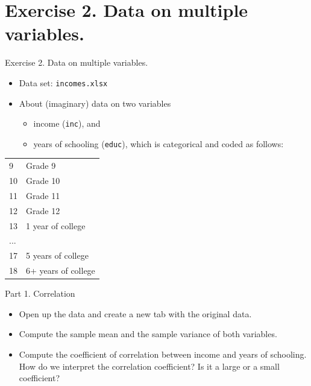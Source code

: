 \documentclass[
  10pt,
  ignorenonframetext,
]{beamer}
\providecommand{\tightlist}{%
  \setlength{\itemsep}{0pt}\setlength{\parskip}{0pt}}
\begin{document}
\hypertarget{exercise-2.-data-on-multiple-variables.}{%
\section{Exercise 2. Data on multiple
variables.}\label{exercise-2.-data-on-multiple-variables.}}

\begin{frame}[fragile]{Exercise 2. Data on multiple variables.}
\begin{itemize}
\tightlist
\item
  Data set: \texttt{incomes.xlsx}
\item
  About (imaginary) data on two variables

  \begin{itemize}
  \tightlist
  \item
    income (\texttt{inc}), and
  \item
    years of schooling (\texttt{educ}), which is categorical and coded
    as follows:
  \end{itemize}
\end{itemize}

\begin{table}
\centering
\begin{tabular}[t]{ll}
\toprule
 & \\
\midrule
9 & Grade 9\\
10 & Grade 10\\
11 & Grade 11\\
12 & Grade 12\\
13 & 1 year of college\\
... & \\
17 & 5 years of college\\
18 & 6+ years of college\\
\bottomrule
\end{tabular}
\end{table}
\end{frame}

\begin{frame}{Part 1. Correlation}
\protect\hypertarget{part-1.-correlation}{}
\begin{itemize}
\tightlist
\item
  Open up the data and create a new tab with the original data.
\item
  Compute the sample mean and the sample variance of both variables.
\item
  Compute the coefficient of correlation between income and years of
  schooling. How do we interpret the correlation coefficient? Is it a
  large or a small coefficient?
\end{itemize}
\end{frame}
\end{document}
